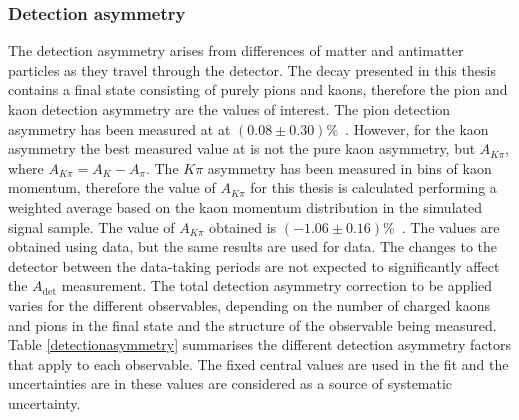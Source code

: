 \subsubsection{Detection asymmetry}

The detection asymmetry arises from differences of matter and antimatter particles as they travel through the detector. The \btodkst decay presented in this thesis contains a final state consisting of purely pions and kaons, therefore the pion and kaon detection asymmetry are the values of interest. The pion detection asymmetry has been measured at \lhcb at $(0.08 \pm 0.30)\%$~\cite{pi_det_asym}. However, for the kaon asymmetry the best measured value at \lhcb is not the pure kaon asymmetry, but $A_{K\pi}$, where $A_{K\pi} = A_K - A_{\pi}$. The $K\pi$ asymmetry has been measured in bins of kaon momentum, therefore the value of $A_{K\pi}$ for this thesis is calculated performing a weighted average based on the kaon momentum distribution in the simulated signal sample. The value of $A_{K\pi}$ obtained is $(-1.06 \pm 0.16)\%$~\cite{k_det_asym}. The values are obtained using \runone data, but the same results are used for \runtwo data. The changes to the detector between the data-taking periods are not expected to significantly affect the $A_{\text{det}}$ measurement. The total detection asymmetry correction to be applied varies for the different \CP observables, depending on the number of charged kaons and pions in the final state and the structure of the \CP observable being measured. Table \ref{detectionasymmetry} summarises the different detection asymmetry factors that apply to each observable. The fixed central values are used in the \CP fit and the uncertainties are in these values are considered as a source of systematic uncertainty.

